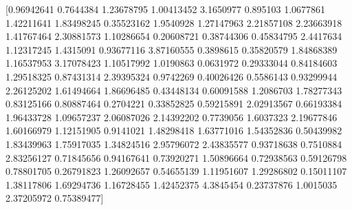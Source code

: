 \documentclass[preview]{standalone}
\begin{document}
\begin{center}
[0.96942641 0.7644384  1.23678795 1.00413452 3.1650977  0.895103
 1.0677861  1.42211641 1.83498245 0.35523162 1.9540928  1.27147963
 2.21857108 2.23663918 1.41767464 2.30881573 1.10286654 0.20608721
 0.38744306 0.45834795 2.4417634  1.12317245 1.4315091  0.93677116
 3.87160555 0.3898615  0.35820579 1.84868389 1.16537953 3.17078423
 1.10517992 1.0190863  0.0631972  0.29333044 0.84184603 1.29518325
 0.87431314 2.39395324 0.9742269  0.40026426 0.5586143  0.93299944
 2.26125202 1.61494664 1.86696485 0.43448134 0.60091588 1.2086703
 1.78277343 0.83125166 0.80887464 0.2704221  0.33852825 0.59215891
 2.02913567 0.66193384 1.96433728 1.09657237 2.06087026 2.14392202
 0.7739056  1.6037323  2.19677846 1.60166979 1.12151905 0.9141021
 1.48298418 1.63771016 1.54352836 0.50439982 1.83439963 1.75917035
 1.34824516 2.95796072 2.43835577 0.93718638 0.7510884  2.83256127
 0.71845656 0.94167641 0.73920271 1.50896664 0.72938563 0.59126798
 0.78801705 0.26791823 1.26092657 0.54655139 1.11951607 1.29286802
 0.15011107 1.38117806 1.69294736 1.16728455 1.42452375 4.3845454
 0.23737876 1.0015035  2.37205972 0.75389477]
\end{center}
\end{document}
